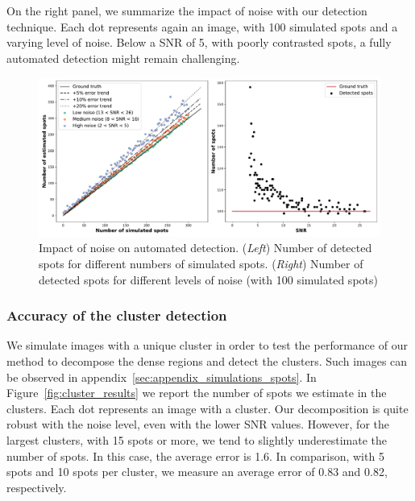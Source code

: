 On the right panel, we summarize the impact of noise with our detection technique.
Each dot represents again an image, with 100 simulated spots and a varying level of noise.
Below a \ac{SNR} of 5, with poorly contrasted spots, a fully automated detection might remain challenging.

\begin{figure}[h]
    \centering
    \includegraphics[width=1\textwidth]{figures/chapter2/fused_spot_detection_noise}
    \caption{Impact of noise on automated detection.
	(\textit{Left}) Number of detected spots for different numbers of simulated spots.
	(\textit{Right}) Number of detected spots for different levels of noise (with 100 simulated spots)}
    \label{fig:detection_error}
\end{figure}

\subsubsection{Accuracy of the cluster detection}

We simulate images with a unique cluster in order to test the performance of our method to decompose the dense regions and detect the clusters.
Such images can be observed in appendix~\ref{sec:appendix_simulations_spots}.
In Figure~\ref{fig:cluster_results} we report the number of spots we estimate in the clusters.
Each dot represents an image with a cluster.
Our decomposition is quite robust with the noise level, even with the lower \ac{SNR} values.
However, for the largest clusters, with 15 spots or more, we tend to slightly underestimate the number of spots.
In this case, the average error is 1.6.
In comparison, with 5 spots and 10 spots per cluster, we measure an average error of 0.83 and 0.82, respectively.

